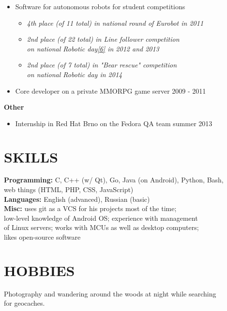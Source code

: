\documentclass[margin]{res}
\begin{document}
\begin{resume}
\begin{itemize}
\begin{itemize}
        \end{itemize}
    \item Software for autonomous robots for student competitions
        \begin{itemize}
            \item \textit{4th place (of 11 total) in national round of Eurobot in 2011}
            \item \textit{2nd place (of 22 total) in Line follower competition \\ on national Robotic day\hyperref[day]{[6]} in 2012 and 2013}
            \item \textit{2nd place (of 7 total) in "Bear rescue" competition \\ on national Robotic day in 2014}
        \end{itemize}
    \item Core developer on a private MMORPG game server \hfill{2009 - 2011}
 \end{itemize}
 {\bf Other}
 \begin{itemize} \itemsep -2pt
    \item Internship in Red Hat Brno on the Fedora QA team \hfill{summer 2013}
 \end{itemize}

\section{SKILLS}
{\bf Programming:} C, C++ (w/ Qt), Go, Java (on Android), Python, Bash,\\web things (HTML, PHP, CSS, JavaScript)\vspace{1.3mm}\\
{\bf Languages:} English (advanced), Russian (basic)\vspace{1.3mm}\\
{\bf Misc:} uses git as a VCS for his projects most of the time; \\ low-level knowledge of Android OS; experience with management\\of Linux servers; works with MCUs as well as desktop computers;\\likes open-source software\vspace{1.3mm}

\section{HOBBIES}
Photography and wandering around the woods at night while searching\\for geocaches.


\end{resume}
\end{document}
